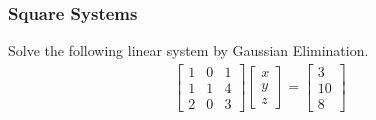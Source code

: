 \subsubsection{Square Systems}
\begin{exmp}
Solve the following linear system by Gaussian Elimination.
\begin{align*}
\begin{bmatrix}
1 & 0 & 1 \\
1 & 1 & 4 \\
2 & 0 & 3
\end{bmatrix}
\begin{bmatrix}
x \\
y \\
z
\end{bmatrix}
=
\begin{bmatrix}
3 \\
10 \\
8
\end{bmatrix}
\end{align*}
\end{exmp}
